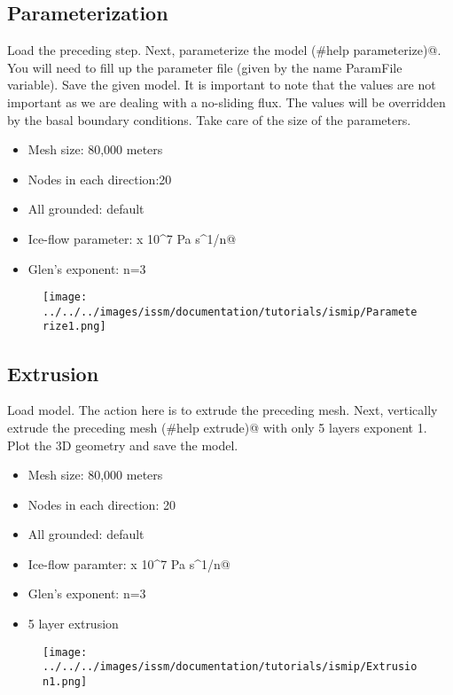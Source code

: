 \subsection{Parameterization} %
Load the preceding step. Next, parameterize the model \verb@(#help parameterize)@. You will need to fill up the parameter file (given by the name ParamFile variable). Save the given model. It is important to note that the values are not important as we are dealing with a no-sliding flux. The values will be overridden by the basal boundary conditions. Take care of the size of the parameters.
\begin{itemize}
	\item Mesh size: 80,000 meters
	\item Nodes in each direction:20
	\item All grounded: default
	\item Ice-flow parameter:  x 10^7 Pa s^1/n@
	\item Glen's exponent: n=3
\end{itemize}
\begin{figure}[H]
	\begin{center}
		\texttt{[image: ../../../images/issm/documentation/tutorials/ismip/Parameterize1.png]}
	\end{center}
\end{figure}
\subsection{Extrusion} %
Load \verb@Parameterization@ model. The action here is to extrude the preceding mesh. Next, vertically
extrude the preceding mesh \verb@(#help extrude)@ with only 5 layers exponent 1. Plot the 3D
geometry and save the model.
\begin{itemize}
	\item Mesh size: 80,000 meters
	\item Nodes in each direction: 20
	\item All grounded: default
	\item Ice-flow paramter:  x 10^7 Pa s^1/n@
	\item Glen's exponent: n=3
	\item 5 layer extrusion
\end{itemize}
\begin{figure}[H]
	\begin{center}
		\texttt{[image: ../../../images/issm/documentation/tutorials/ismip/Extrusion1.png]}
	\end{center}
\end{figure}

